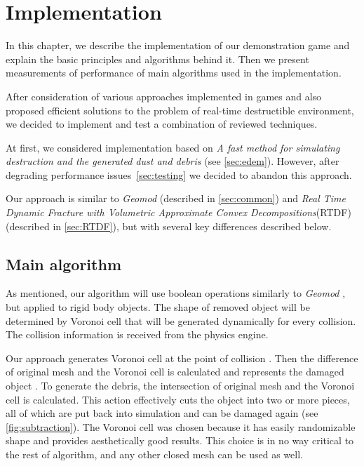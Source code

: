 \chapter{Implementation}
\label{chaptImplementation}
In this chapter, we describe the implementation of our demonstration game and explain the basic principles and algorithms behind it. Then we present measurements of performance of main algorithms used in the implementation.

After consideration of various approaches implemented in games and also proposed efficient solutions to the problem of real-time destructible environment, we decided to implement and test a combination of reviewed techniques.  

At first, we considered implementation based on \emph{A fast method for simulating destruction and the generated dust and debris} (see \cref{sec:edem}). However, after degrading performance issues~\cref{sec:testing} we decided to abandon this approach.

Our approach is similar to \emph{Geomod} (described in \cref{sec:common}) and \emph{Real Time Dynamic Fracture with Volumetric Approximate Convex Decompositions}(RTDF) (described in \cref{sec:RTDF}), but with several key differences described below.

\section{Main algorithm}
As mentioned, our algorithm will use boolean operations similarly to \emph{Geomod} , but applied to rigid body objects. The shape of removed object will be determined by Voronoi cell that will be generated dynamically for every collision. The collision information is received from the physics engine.

Our approach generates Voronoi cell at the point of collision . Then the difference of original mesh and the Voronoi cell is calculated and represents the damaged object . To generate the debris, the intersection of original mesh and the Voronoi cell is calculated. This action effectively cuts the object into two or more pieces, all of which are put back into simulation and can be damaged again (see \cref{fig:subtraction}). The Voronoi cell was chosen because it has easily randomizable shape and provides aesthetically good results. This choice is in no way critical to the rest of algorithm, and any other closed mesh can be used as well.

